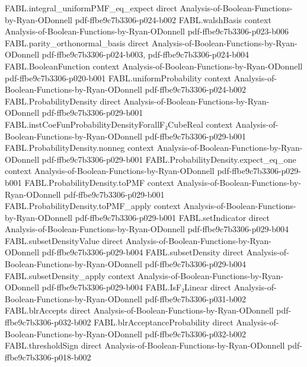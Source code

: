 \begin{theorem}
\proofstep
  {FABL.integral_uniformPMF_eq_expect}
  {direct}
  {Analysis-of-Boolean-Functions-by-Ryan-ODonnell}
  {pdf-ffbe9c7b3306-p024-b002}
\proofstep
  {FABL.walshBasis}
  {context}
  {Analysis-of-Boolean-Functions-by-Ryan-ODonnell}
  {pdf-ffbe9c7b3306-p023-b006}
\proofstep
  {FABL.parity_orthonormal_basis}
  {direct}
  {Analysis-of-Boolean-Functions-by-Ryan-ODonnell}
  {pdf-ffbe9c7b3306-p024-b003,
    pdf-ffbe9c7b3306-p024-b004}
\proofstep
  {FABL.BooleanFunction}
  {context}
  {Analysis-of-Boolean-Functions-by-Ryan-ODonnell}
  {pdf-ffbe9c7b3306-p020-b001}
\proofstep
  {FABL.uniformProbability}
  {context}
  {Analysis-of-Boolean-Functions-by-Ryan-ODonnell}
  {pdf-ffbe9c7b3306-p024-b002}
\proofstep
  {FABL.ProbabilityDensity}
  {direct}
  {Analysis-of-Boolean-Functions-by-Ryan-ODonnell}
  {pdf-ffbe9c7b3306-p029-b001}
\proofstep
  {FABL.instCoeFunProbabilityDensityForallF₂CubeReal}
  {context}
  {Analysis-of-Boolean-Functions-by-Ryan-ODonnell}
  {pdf-ffbe9c7b3306-p029-b001}
\proofstep
  {FABL.ProbabilityDensity.nonneg}
  {context}
  {Analysis-of-Boolean-Functions-by-Ryan-ODonnell}
  {pdf-ffbe9c7b3306-p029-b001}
\proofstep
  {FABL.ProbabilityDensity.expect_eq_one}
  {context}
  {Analysis-of-Boolean-Functions-by-Ryan-ODonnell}
  {pdf-ffbe9c7b3306-p029-b001}
\proofstep
  {FABL.ProbabilityDensity.toPMF}
  {context}
  {Analysis-of-Boolean-Functions-by-Ryan-ODonnell}
  {pdf-ffbe9c7b3306-p029-b001}
\proofstep
  {FABL.ProbabilityDensity.toPMF_apply}
  {context}
  {Analysis-of-Boolean-Functions-by-Ryan-ODonnell}
  {pdf-ffbe9c7b3306-p029-b001}
\proofstep
  {FABL.setIndicator}
  {direct}
  {Analysis-of-Boolean-Functions-by-Ryan-ODonnell}
  {pdf-ffbe9c7b3306-p029-b004}
\proofstep
  {FABL.subsetDensityValue}
  {direct}
  {Analysis-of-Boolean-Functions-by-Ryan-ODonnell}
  {pdf-ffbe9c7b3306-p029-b004}
\proofstep
  {FABL.subsetDensity}
  {direct}
  {Analysis-of-Boolean-Functions-by-Ryan-ODonnell}
  {pdf-ffbe9c7b3306-p029-b004}
\proofstep
  {FABL.subsetDensity_apply}
  {context}
  {Analysis-of-Boolean-Functions-by-Ryan-ODonnell}
  {pdf-ffbe9c7b3306-p029-b004}
\proofstep
  {FABL.IsF₂Linear}
  {direct}
  {Analysis-of-Boolean-Functions-by-Ryan-ODonnell}
  {pdf-ffbe9c7b3306-p031-b002}
\proofstep
  {FABL.blrAccepts}
  {direct}
  {Analysis-of-Boolean-Functions-by-Ryan-ODonnell}
  {pdf-ffbe9c7b3306-p032-b002}
\proofstep
  {FABL.blrAcceptanceProbability}
  {direct}
  {Analysis-of-Boolean-Functions-by-Ryan-ODonnell}
  {pdf-ffbe9c7b3306-p032-b002}
\proofstep
  {FABL.thresholdSign}
  {direct}
  {Analysis-of-Boolean-Functions-by-Ryan-ODonnell}
  {pdf-ffbe9c7b3306-p018-b002}
\proofstep

\end{theorem}
